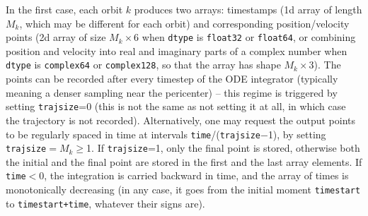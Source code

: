 \documentclass[12pt]{article}
\newcommand{\ppp}[1]{\textcolor{darkolive} {\texttt{#1}}}
\begin{document}
In the first case, each orbit $k$ produces two arrays: timestamps (1d array of length $M_k$, which may be different for each orbit) and corresponding position/velocity points (2d array of size $M_k \times 6$ when \ppp{dtype} is \texttt{float32} or \texttt{float64}, or combining position and velocity into real and imaginary parts of a complex number when \ppp{dtype} is \texttt{complex64} or \texttt{complex128}, so that the array has shape $M_k \times 3$). The points can be recorded after every timestep of the ODE integrator (typically meaning a denser sampling near the pericenter) -- this regime is triggered by setting \ppp{trajsize}=0 (this is not the same as not setting it at all, in which case the trajectory is not recorded). Alternatively, one may request the output points to be regularly spaced in time at intervals \texttt{time}/(\texttt{trajsize}$-$1), by setting \ppp{trajsize}${}=M_k\ge$1. If \ppp{trajsize}=1, only the final point is stored, otherwise both the initial and the final point are stored in the first and the last array elements. If \ppp{time}$<$0, the integration is carried backward in time, and the array of times is monotonically decreasing (in any case, it goes from the initial moment \ppp{timestart} to \ppp{timestart+time}, whatever their signs are).\\
\end{document}
